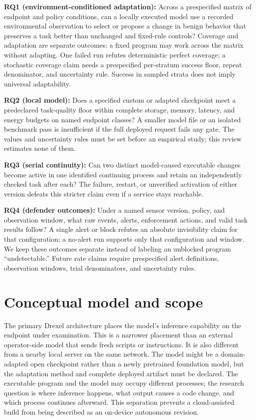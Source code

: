 \documentclass[11pt,letterpaper]{article}
\begin{document}
\textbf{RQ1 (environment-conditioned adaptation):} Across a prespecified matrix of endpoint and policy conditions, can a locally executed model use a recorded environmental observation to select or propose a change in benign behavior that preserves a task better than unchanged and fixed-rule controls? Coverage and adaptation are separate outcomes: a fixed program may work across the matrix without adapting. One failed run refutes deterministic perfect coverage; a stochastic coverage claim needs a prespecified per-stratum success floor, repeat denominator, and uncertainty rule. Success in sampled strata does not imply universal adaptability.

\textbf{RQ2 (local model):} Does a specified custom or adapted checkpoint meet a predeclared task-quality floor within complete storage, memory, latency, and energy budgets on named endpoint classes? A smaller model file or an isolated benchmark pass is insufficient if the full deployed request fails any gate. The values and uncertainty rules must be set before an empirical study; this review estimates none of them.

\textbf{RQ3 (serial continuity):} Can two distinct model-caused executable changes become active in one identified continuing process and retain an independently checked task after each? The failure, restart, or unverified activation of either version defeats this stricter claim even if a service stays reachable.

\textbf{RQ4 (defender outcomes):} Under a named sensor version, policy, and observation window, what raw events, alerts, enforcement actions, and valid task results follow? A single alert or block refutes an absolute invisibility claim for that configuration; a no-alert run supports only that configuration and window. We keep these outcomes separate instead of labeling an unblocked program ``undetectable.'' Future rate claims require prespecified alert definitions, observation windows, trial denominators, and uncertainty rules.

\section{Conceptual model and scope}\label{sec:model}

The primary Drexel architecture places the model's inference capability on the endpoint under examination. This is a narrower placement than an external operator-side model that sends fresh scripts or instructions. It is also different from a nearby local server on the same network. The model might be a domain-adapted open checkpoint rather than a newly pretrained foundation model, but the adaptation method and complete deployed artifact must be declared. The executable program and the model may occupy different processes; the research question is where inference happens, what output causes a code change, and which process continues afterward. This separation prevents a cloud-assisted build from being described as an on-device autonomous revision.
\end{document}
